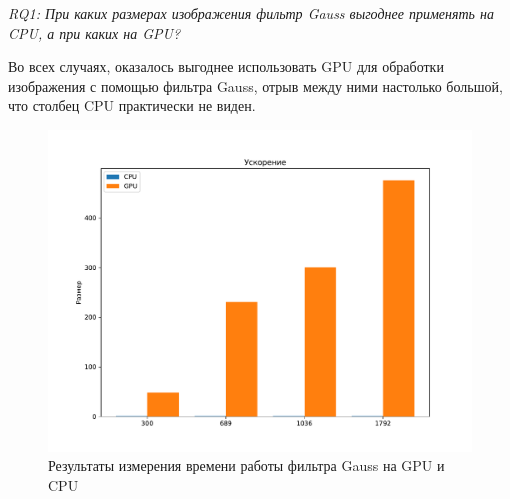 \textit{RQ1: При каких размерах изображения фильтр Gauss выгоднее применять на CPU, а при каких на GPU?}

Во всех случаях, оказалось выгоднее использовать GPU для обработки изображения с помощью фильтра Gauss, отрыв между ними настолько большой, что столбец CPU практически не виден. 


\begin{landscape}
\begin{figure}
    \thispagestyle{empty} 
    \centering
    \includegraphics[height=0.8\textwidth]{figures/bar.pdf}
    \caption{Результаты измерения времени работы фильтра Gauss на GPU и CPU\\}
    \label{fig:bar}
\end{figure}
\end{landscape}
